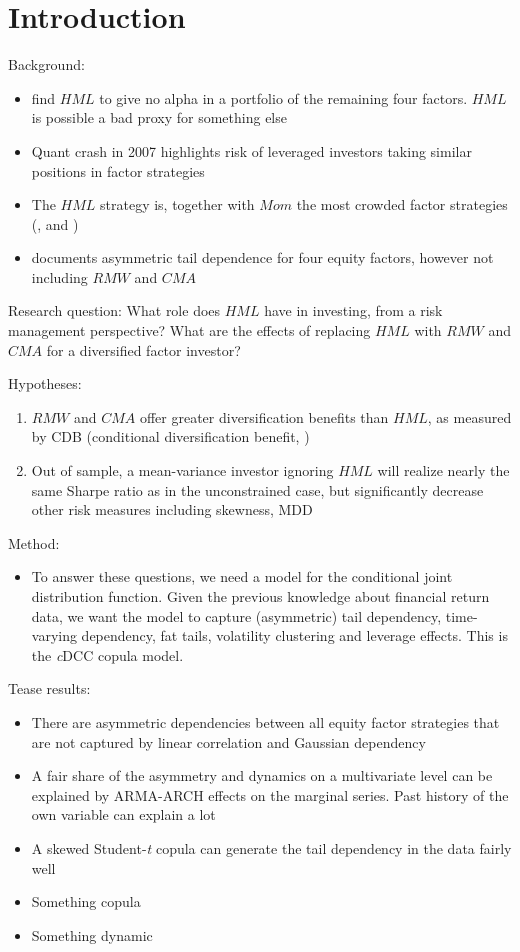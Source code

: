 \section{Introduction}
Background:
\begin{itemize}
	\item \textcite{FF2015} find $HML$ to give no alpha in a portfolio of the remaining four factors. $HML$ is possible a bad proxy for something else
	\item Quant crash in 2007 highlights risk of leveraged investors taking similar positions in factor strategies \autocite{KhandaniLo2011}
	\item The $HML$ strategy is, together with $Mom$ the most crowded factor strategies (\textcite{Pedersen2015}, \textcite{AQREMN} and \textcite{McKEMN})
	\item \textcite{ChristoffersenLanglois2013} documents asymmetric tail dependence for four equity factors, however not including $RMW$ and $CMA$
\end{itemize}

Research question:
What role does $HML$ have in investing, from a risk management perspective? What are the effects of replacing $HML$ with $RMW$ and $CMA$ for a diversified factor investor?

Hypotheses:
\begin{enumerate}
	\item $RMW$ and $CMA$ offer greater diversification benefits than $HML$, as measured by CDB (conditional diversification benefit, \autocite{ChristoffersenErrunzaJacobLanglois2012})
	\item Out of sample, a mean-variance investor ignoring $HML$ will realize nearly the same Sharpe ratio as in the unconstrained case, but significantly decrease other risk measures including skewness, MDD
\end{enumerate}

Method:
\begin{itemize}
	\item To answer these questions, we need a model for the conditional joint distribution function. Given the previous knowledge about financial return data, we want the model to capture (asymmetric) tail dependency, time-varying dependency, fat tails, volatility clustering and leverage effects. This is the \textit{c}DCC copula model.
\end{itemize}	

Tease results:
\begin{itemize}
	\item There are asymmetric dependencies between all equity factor strategies that are not captured by linear correlation and Gaussian dependency
	\item A fair share of the asymmetry and dynamics on a multivariate level can be explained by ARMA-ARCH effects on the marginal series. Past history of the own variable can explain a lot
	\item A skewed Student-\textit{t} copula can generate the tail dependency in the data fairly well
	\item Something copula
	\item Something dynamic
\end{itemize}	
